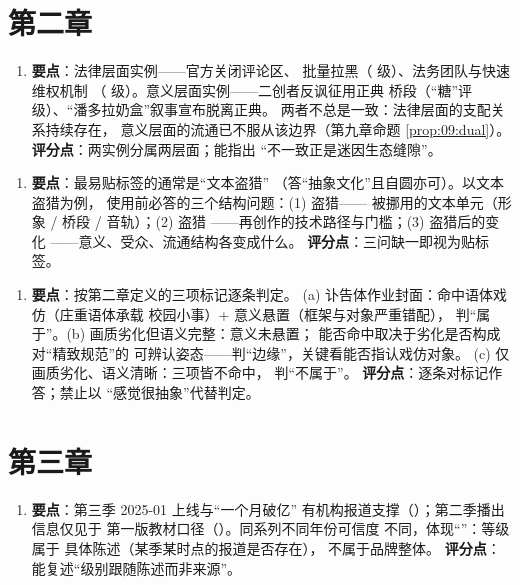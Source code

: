 \section{第二章}\label{app:ans:02}

\begin{enumerate}[label=\textbf{1.},leftmargin=2.6em]
  \item \textbf{要点}：法律层面实例——官方关闭评论区、
        批量拉黑（ 级）、法务团队与快速维权机制
        （ 级）。意义层面实例——二创者反讽征用正典
        桥段（“糖”评级）、“潘多拉奶盒”叙事宣布脱离正典。
        两者不总是一致：法律层面的支配关系持续存在，
        意义层面的流通已不服从该边界（第九章命题
        \ref{prop:09:dual}）。
        \textbf{评分点}：两实例分属两层面；能指出
        “不一致正是迷因生态缝隙”。
\end{enumerate}

\begin{enumerate}[label=\textbf{2.},leftmargin=2.6em]
  \item \textbf{要点}：最易贴标签的通常是“文本盗猎”
        （答“抽象文化”且自圆亦可）。以文本盗猎为例，
        使用前必答的三个结构问题：(1) 盗猎——
        被挪用的文本单元（形象 / 桥段 / 音轨）；(2) 盗猎
        ——再创作的技术路径与门槛；(3) 盗猎后的变化
        ——意义、受众、流通结构各变成什么。
        \textbf{评分点}：三问缺一即视为贴标签。
\end{enumerate}

\begin{enumerate}[label=\textbf{3.},leftmargin=2.6em]
  \item \textbf{要点}：按第二章定义的三项标记逐条判定。
        (a) 讣告体作业封面：命中语体戏仿（庄重语体承载
        校园小事）+ 意义悬置（框架与对象严重错配），
        判“属于”。(b) 画质劣化但语义完整：意义未悬置；
        能否命中取决于劣化是否构成对“精致规范”的
        可辨认姿态——判“边缘”，关键看能否指认戏仿对象。
        (c) 仅画质劣化、语义清晰：三项皆不命中，
        判“不属于”。
        \textbf{评分点}：逐条对标记作答；禁止以
        “感觉很抽象”代替判定。
\end{enumerate}

\section{第三章}\label{app:ans:03}

\begin{enumerate}[label=\textbf{1.},leftmargin=2.6em]
  \item \textbf{要点}：第三季 2025-01 上线与“一个月破亿”
        有机构报道支撑（）；第二季播出信息仅见于
        第一版教材口径（）。同系列不同年份可信度
        不同，体现“”：等级属于
        具体陈述（某季某时点的报道是否存在），
        不属于品牌整体。
        \textbf{评分点}：能复述“级别跟随陈述而非来源”。
\end{enumerate}

